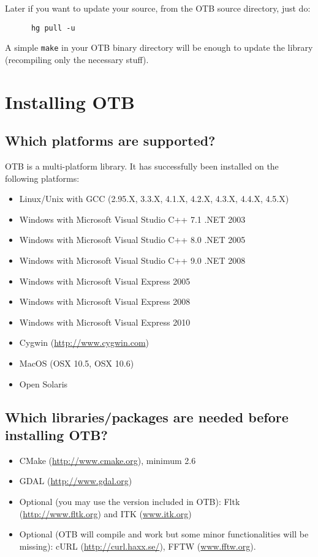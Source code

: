 Later if you want to update your source, from the OTB source directory, just do:
\begin{verbatim}
      hg pull -u
\end{verbatim}

A simple \texttt{make} in your OTB binary directory will be enough to update the library (recompiling only the necessary stuff).


\section{Installing OTB}
\label{sec:FAQInstall}
\subsection{Which platforms are supported?}
OTB is a multi-platform library. It has successfully been installed on
the following platforms:
\begin{itemize}
  \item Linux/Unix with GCC (2.95.X, 3.3.X, 4.1.X, 4.2.X, 4.3.X, 4.4.X, 4.5.X)
  \item Windows with Microsoft Visual Studio C++ 7.1 .NET 2003
  \item Windows with Microsoft Visual Studio C++ 8.0 .NET 2005
  \item Windows with Microsoft Visual Studio C++ 9.0 .NET 2008
  \item Windows with Microsoft Visual Express 2005
  \item Windows with Microsoft Visual Express 2008
  \item Windows with Microsoft Visual Express 2010
  \item Cygwin (\url{http://www.cygwin.com})
  \item MacOS (OSX 10.5, OSX 10.6)
  \item Open Solaris
\end{itemize}

\subsection{Which libraries/packages are needed before installing
 OTB?}
\begin{itemize}
\item CMake (\url{http://www.cmake.org}), minimum 2.6
\item GDAL (\url{http://www.gdal.org})
\item Optional (you may use the version included in OTB): Fltk (\url{http://www.fltk.org}) and ITK (\url{www.itk.org})
\item Optional (OTB will compile and work but some minor functionalities will be missing): cURL (\url{http://curl.haxx.se/}), FFTW (\url{www.fftw.org}).
\end{itemize}

